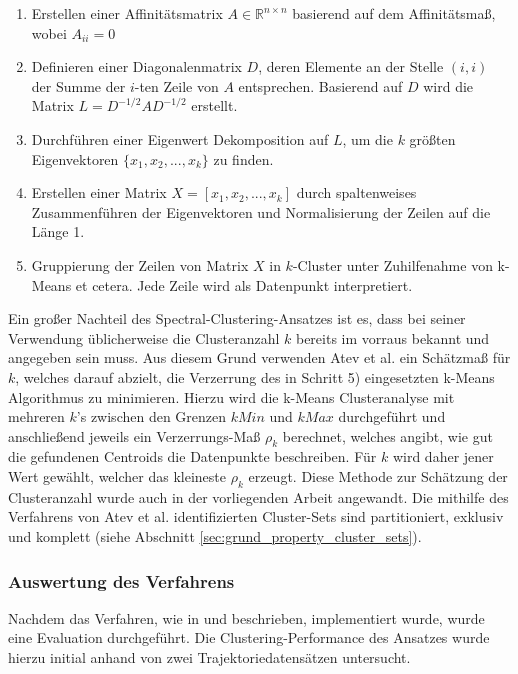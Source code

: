 \begin{enumerate}
    \item Erstellen einer Affinitätsmatrix $A \in \mathbb{R}^{n \times n}$ basierend auf dem Affinitätsmaß, wobei $A_{ii} = 0$
    \item Definieren einer Diagonalenmatrix $D$, deren Elemente an der Stelle $(i,i)$ der Summe der $i$-ten
            Zeile von $A$ entsprechen. Basierend auf $D$ wird die Matrix $L = D^{-1/2} AD^{-1/2}$ erstellt.
    \item Durchführen einer Eigenwert Dekomposition auf $L$, um die $k$ größten Eigenvektoren
            $\{x_1, x_2, ..., x_k\}$ zu finden.
    \item Erstellen einer Matrix $X = [x_1, x_2,..., x_k]$ durch spaltenweises Zusammenführen der Eigenvektoren und
            Normalisierung der Zeilen auf die Länge 1.
    \item Gruppierung der Zeilen von Matrix $X$ in $k$-Cluster unter Zuhilfenahme von k-Means et cetera.
            Jede Zeile wird als Datenpunkt interpretiert.
\end{enumerate}

Ein großer Nachteil des Spectral-Clustering-Ansatzes ist es, dass bei seiner Verwendung üblicherweise die Clusteranzahl $k$
bereits im vorraus bekannt und angegeben sein muss. Aus diesem Grund verwenden Atev et al. ein Schätzmaß für
$k$, welches darauf abzielt, die Verzerrung des in Schritt 5) eingesetzten k-Means Algorithmus zu minimieren.
Hierzu wird die k-Means Clusteranalyse mit mehreren $k$'s zwischen den Grenzen $kMin$ und $kMax$ durchgeführt
und anschließend jeweils ein Verzerrungs-Maß $\rho_k$ berechnet, welches angibt, wie gut die gefundenen Centroids
die Datenpunkte beschreiben. Für $k$ wird daher jener Wert gewählt, welcher das
kleineste $\rho_k$ erzeugt. Diese Methode zur Schätzung der Clusteranzahl wurde auch in der vorliegenden
Arbeit angewandt.
Die mithilfe des Verfahrens von Atev et al. identifizierten Cluster-Sets sind partitioniert, exklusiv und komplett
(siehe Abschnitt \ref{sec:grund_property_cluster_sets}).

\subsubsection{Auswertung des Verfahrens}

Nachdem das Verfahren, wie in \cite[]{Atev2006} und \cite[]{Ng2002} beschrieben, implementiert wurde,
wurde eine Evaluation durchgeführt. Die Clustering-Performance des Ansatzes
wurde hierzu initial anhand von zwei Trajektoriedatensätzen untersucht.

